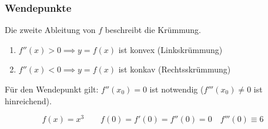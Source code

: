 \subsubsection*{Wendepunkte}
\begin{note}
	Die zweite Ableitung von $f$ beschreibt die Krümmung.
\end{note}
\begin{enumerate}
	\item $f''(x) > 0 \implies y = f(x)$ ist konvex (Linkskrümmung)
	\item $f''(x) < 0 \implies y = f(x)$ ist konkav (Rechtsskrümmung)
\end{enumerate}
Für den Wendepunkt gilt: $f''(x_0) = 0$ ist notwendig ($f'''(x_0) \neq 0$ ist hinreichend).
\begin{example}
	\begin{equation*}
		f(x) = x^3 \qquad f(0) = f'(0) = f''(0) = 0 \quad f'''(0) \equiv 6
	\end{equation*}
\end{example}
